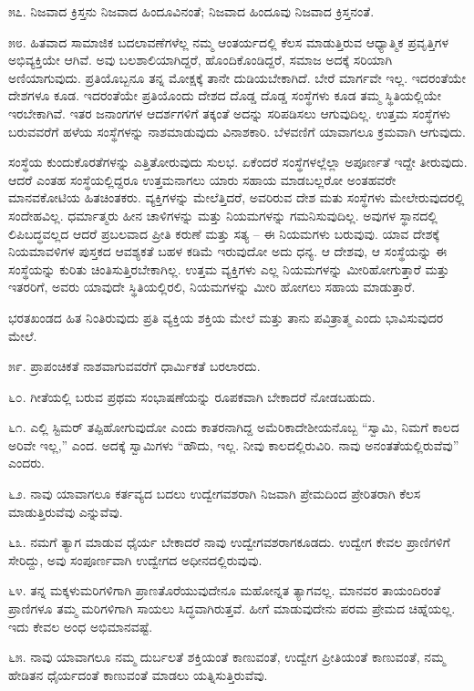 ೫೭. ನಿಜವಾದ ಕ್ರಿಸ್ತನು ನಿಜವಾದ ಹಿಂದೂವಿನಂತೆ; ನಿಜವಾದ ಹಿಂದೂವು ನಿಜವಾದ ಕ್ರಿಸ್ತನಂತೆ.

೫೮. ಹಿತವಾದ ಸಾಮಾಜಿಕ ಬದಲಾವಣೆಗಳೆಲ್ಲ ನಮ್ಮ ಆಂತರ್ಯದಲ್ಲಿ ಕೆಲಸ ಮಾಡುತ್ತಿರುವ ಆಧ್ಯಾತ್ಮಿಕ ಪ್ರವೃತ್ತಿಗಳ ಅಭಿವ್ಯಕ್ತಿಯೇ ಆಗಿವೆ. ಅವು ಬಲಶಾಲಿಯಾಗಿದ್ದರೆ, ಹೊಂದಿಕೊಂಡಿದ್ದರೆ, ಸಮಾಜ ಅದಕ್ಕೆ ಸರಿಯಾಗಿ ಅಣಿಯಾಗುವುದು. ಪ್ರತಿಯೊಬ್ಬನೂ ತನ್ನ ಮೋಕ್ಷಕ್ಕೆ ತಾನೇ ದುಡಿಯಬೇಕಾಗಿದೆ. ಬೇರೆ ಮಾರ್ಗವೇ ಇಲ್ಲ. ಇದರಂತೆಯೇ ದೇಶಗಳೂ ಕೂಡ. ಇದರಂತೆಯೇ ಪ್ರತಿಯೊಂದು ದೇಶದ ದೊಡ್ಡ ದೊಡ್ಡ ಸಂಸ್ಥೆಗಳು ಕೂಡ ತಮ್ಮ ಸ್ಥಿತಿಯಲ್ಲಿಯೇ ಇರಬೇಕಾಗಿವೆ. ಇತರ ಜನಾಂಗಗಳ ಆದರ್ಶಗಳಿಗೆ ತಕ್ಕಂತೆ ಅದನ್ನು ಸರಿಪಡಿಸಲು ಆಗುವುದಿಲ್ಲ. ಉತ್ತಮ ಸಂಸ್ಥೆಗಳು ಬರುವವರೆಗೆ ಹಳೆಯ ಸಂಸ್ಥೆಗಳನ್ನು ನಾಶಮಾಡುವುದು ವಿನಾಶಕಾರಿ. ಬೆಳವಣಿಗೆ ಯಾವಾಗಲೂ ಕ್ರಮವಾಗಿ ಆಗುವುದು.

ಸಂಸ್ಥೆಯ ಕುಂದುಕೊರತೆಗಳನ್ನು ಎತ್ತಿತೋರುವುದು ಸುಲಭ. ಏಕೆಂದರೆ ಸಂಸ್ಥೆಗಳಲ್ಲೆಲ್ಲಾ ಅಪೂರ್ಣತೆ ಇದ್ದೇ ತೀರುವುದು. ಆದರೆ ಎಂತಹ ಸಂಸ್ಥೆಯಲ್ಲಿದ್ದರೂ ಉತ್ತಮನಾಗಲು ಯಾರು ಸಹಾಯ ಮಾಡಬಲ್ಲರೋ ಅಂತಹವರೇ ಮಾನವಕೋಟಿಯ ಹಿತಚಿಂತಕರು. ವ್ಯಕ್ತಿಗಳನ್ನು ಮೇಲೆತ್ತಿದರೆ, ಅವರಿರುವ ದೇಶ ಮತು ಸಂಸ್ಥೆಗಳು ಮೇಲೇರುವುದರಲ್ಲಿ ಸಂದೇಹವಿಲ್ಲ. ಧರ್ಮಾತ್ಮರು ಹೀನ ಚಾಳಿಗಳನ್ನು ಮತ್ತು ನಿಯಮಗಳನ್ನು ಗಮನಿಸುವುದಿಲ್ಲ. ಅವುಗಳ ಸ್ಥಾನದಲ್ಲಿ ಲಿಪಿಬದ್ಧವಲ್ಲದ ಆದರೆ ಪ್ರಬಲವಾದ ಪ್ರೀತಿ ಕರುಣೆ ಮತ್ತು ಸತ್ಯ – ಈ ನಿಯಮಗಳು ಬರುವುವು. ಯಾವ ದೇಶಕ್ಕೆ ನಿಯಮಾವಳಿಗಳ ಪುಸ್ತಕದ ಆವಶ್ಯಕತೆ ಬಹಳ ಕಡಿಮೆ ಇರುವುದೋ ಅದು ಧನ್ಯ. ಆ ದೇಶವು, ಆ ಸಂಸ್ಥೆಯನ್ನು ಈ ಸಂಸ್ಥೆಯನ್ನು ಕುರಿತು ಚಿಂತಿಸುತ್ತಿರಬೇಕಾಗಿಲ್ಲ. ಉತ್ತಮ ವ್ಯಕ್ತಿಗಳು ಎಲ್ಲ ನಿಯಮಗಳನ್ನು ಮೀರಿಹೋಗುತ್ತಾರೆ ಮತ್ತು ಇತರರಿಗೆ, ಅವರು ಯಾವುದೇ ಸ್ಥಿತಿಯಲ್ಲಿರಲಿ, ನಿಯಮಗಳನ್ನು ಮೀರಿ ಹೋಗಲು ಸಹಾಯ ಮಾಡುತ್ತಾರೆ.

ಭರತಖಂಡದ ಹಿತ ನಿಂತಿರುವುದು ಪ್ರತಿ ವ್ಯಕ್ತಿಯ ಶಕ್ತಿಯ ಮೇಲೆ ಮತ್ತು ತಾನು ಪವಿತ್ರಾತ್ಮ ಎಂದು ಭಾವಿಸುವುದರ ಮೇಲೆ.

೫೯. ಪ್ರಾಪಂಚಿಕತೆ ನಾಶವಾಗುವವರೆಗೆ ಧಾರ್ಮಿಕತೆ ಬರಲಾರದು.

೬೦. ಗೀತೆಯಲ್ಲಿ ಬರುವ ಪ್ರಥಮ ಸಂಭಾಷಣೆಯನ್ನು ರೂಪಕವಾಗಿ ಬೇಕಾದರೆ ನೋಡಬಹುದು.

೬೧. ಎಲ್ಲಿ ಸ್ಟಿಮರ್ ತಪ್ಪಿಹೋಗುವುದೋ ಎಂದು ಕಾತರನಾಗಿದ್ದ ಅಮೆರಿಕಾದೇಶೀಯನೊಬ್ಬ “ಸ್ವಾಮಿ, ನಿಮಗೆ ಕಾಲದ ಅರಿವೇ ಇಲ್ಲ,” ಎಂದ. ಅದಕ್ಕೆ ಸ್ವಾಮಿಗಳು “ಹೌದು, ಇಲ್ಲ. ನೀವು ಕಾಲದಲ್ಲಿರುವಿರಿ. ನಾವು ಅನಂತತೆಯಲ್ಲಿರುವೆವು” ಎಂದರು.

೬೨. ನಾವು ಯಾವಾಗಲೂ ಕರ್ತವ್ಯದ ಬದಲು ಉದ್ವೇಗವಶರಾಗಿ ನಿಜವಾಗಿ ಪ್ರೇಮದಿಂದ ಪ್ರೇರಿತರಾಗಿ ಕೆಲಸ ಮಾಡುತ್ತಿರುವೆವು ಎನ್ನುವೆವು.

೬೩. ನಮಗೆ ತ್ಯಾಗ ಮಾಡುವ ಧೈರ್ಯ ಬೇಕಾದರೆ ನಾವು ಉದ್ವೇಗವಶರಾಗಕೂಡದು. ಉದ್ವೇಗ ಕೇವಲ ಪ್ರಾಣಿಗಳಿಗೆ ಸೇರಿದ್ದು, ಅವು ಸಂಪೂರ್ಣವಾಗಿ ಉದ್ವೇಗದ ಅಧೀನದಲ್ಲಿರುವುವು.

೬೪. ತನ್ನ ಮಕ್ಕಳುಮರಿಗಳಿಗಾಗಿ ಪ್ರಾಣತೊರೆಯುವುದೇನೂ ಮಹೋನ್ನತ ತ್ಯಾಗವಲ್ಲ. ಮಾನವರ ತಾಯಂದಿರಂತೆ ಪ್ರಾಣಿಗಳೂ ತಮ್ಮ ಮರಿಗಳಿಗಾಗಿ ಸಾಯಲು ಸಿದ್ಧವಾಗಿರುತ್ತವೆ. ಹೀಗೆ ಮಾಡುವುದೇನು ಪರಮ ಪ್ರೇಮದ ಚಿಹ್ನೆಯಲ್ಲ. ಇದು ಕೇವಲ ಅಂಧ ಅಭಿಮಾನವಷ್ಟೆ.

೬೫. ನಾವು ಯಾವಾಗಲೂ ನಮ್ಮ ದುರ್ಬಲತೆ ಶಕ್ತಿಯಂತೆ ಕಾಣುವಂತೆ, ಉದ್ವೇಗ ಪ್ರೀತಿಯಂತೆ ಕಾಣುವಂತೆ, ನಮ್ಮ ಹೇಡಿತನ ಧೈರ್ಯದಂತೆ ಕಾಣುವಂತೆ ಮಾಡಲು ಯತ್ನಿಸುತ್ತಿರುವೆವು.

